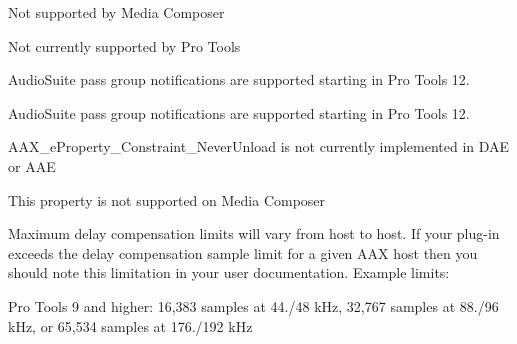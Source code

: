 \begin{DoxyRefList}
Not supported by Media Composer 
\item[Member \mbox{\hyperlink{a00491_a86f7310877399d9d4d2ea4863d472476a2524774deef9e82058134126dc729a5a}{A\+A\+X\+\_\+e\+Plug\+In\+Strings\+\_\+\+Progress}} ]\label{a00786__compatibility_notes000028}%
%
 Not currently supported by Pro Tools 
\item[Member \mbox{\hyperlink{a00491_a6ec854be40c8cf810dec97de3e56c0a7a1fb443ff62601d3e5f5562a4af8edf41}{A\+A\+X\+\_\+e\+Processing\+State\+\_\+\+Begin\+Pass\+Group}} ]\label{a00786__compatibility_notes000050}%
%
 Audio\+Suite pass group notifications are supported starting in Pro Tools 12.  
\item[Member \mbox{\hyperlink{a00491_a6ec854be40c8cf810dec97de3e56c0a7a6c7dcf22600f9fe8a6113dbd5ffd1605}{A\+A\+X\+\_\+e\+Processing\+State\+\_\+\+End\+Pass\+Group}} ]\label{a00786__compatibility_notes000049}%
%
 Audio\+Suite pass group notifications are supported starting in Pro Tools 12.  
\item[Member \mbox{\hyperlink{a00662_a13e384f22825afd3db6d68395b79ce0da734930f534d7af40835db1b12afb209e}{A\+A\+X\+\_\+e\+Property\+\_\+\+Constraint\+\_\+\+Never\+Unload}} ]\label{a00786__compatibility_notes000071}%
%
 A\+A\+X\+\_\+e\+Property\+\_\+\+Constraint\+\_\+\+Never\+Unload is not currently implemented in D\+AE or A\+AE  
\item[Member \mbox{\hyperlink{a00662_a13e384f22825afd3db6d68395b79ce0dadd8839e5678c8880215e318197cc8d3a}{A\+A\+X\+\_\+e\+Property\+\_\+\+Destination\+Track}} ]\label{a00786__compatibility_notes000069}%
%
 This property is not supported on Media Composer 
\item[Member \mbox{\hyperlink{a00662_a13e384f22825afd3db6d68395b79ce0daa9037ffd2caf892bafe8f7f170548cb4}{A\+A\+X\+\_\+e\+Property\+\_\+\+Latency\+Contribution}} ]\label{a00786__compatibility_notes000065}%
%
 Maximum delay compensation limits will vary from host to host. If your plug-\/in exceeds the delay compensation sample limit for a given A\+AX host then you should note this limitation in your user documentation. Example limits\+:
\begin{DoxyItemize}
\item Pro Tools 9 and higher\+: 16,383 samples at 44./48 k\+Hz, 32,767 samples at 88./96 k\+Hz, or 65,534 samples at 176./192 k\+Hz

\end{DoxyItemize}
\end{DoxyRefList}
